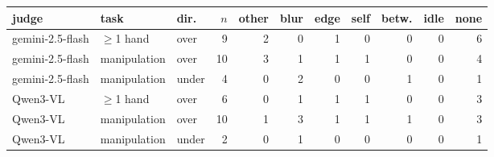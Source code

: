 \begin{tabular}{@{}lllr rrrrrrr@{}}
\toprule
judge & task & dir. & $n$ & other & blur & edge & self & betw. & idle & none \\
\midrule
gemini-2.5-flash & $\geq$1 hand & over & 9 & 2 & 0 & 1 & 0 & 0 & 0 & 6 \\
gemini-2.5-flash & manipulation & over & 10 & 3 & 1 & 1 & 1 & 0 & 0 & 4 \\
gemini-2.5-flash & manipulation & under & 4 & 0 & 2 & 0 & 0 & 1 & 0 & 1 \\
Qwen3-VL & $\geq$1 hand & over & 6 & 0 & 1 & 1 & 1 & 0 & 0 & 3 \\
Qwen3-VL & manipulation & over & 10 & 1 & 3 & 1 & 1 & 1 & 0 & 3 \\
Qwen3-VL & manipulation & under & 2 & 0 & 1 & 0 & 0 & 0 & 0 & 1 \\
\bottomrule
\end{tabular}

